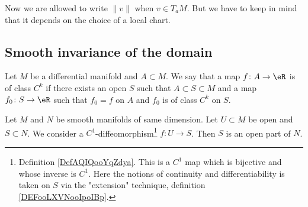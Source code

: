 Now we are allowed to write \( \| v \|\) when \( v\in T_aM\). But we have to keep in mind that it depends on the choice of a local chart.

\subsection{Smooth invariance of the domain}


\begin{definition}	\label{DEFooLXVNooIpoIBp}
	Let \( M\) be a differential manifold and \( A\subset M\). We say that a map \(f \colon A\to \eR  \) is of class \( C^k\) if there exists an open \( S\) such that \( A\subset S\subset M\) and a map \(f_0 \colon S\to \eR  \) such that \( f_0=f\) on \( A\) and \( f_0\) is of class \( C^k\) on \( S\).
\end{definition}

\begin{theorem}	\label{THOooGUELooSBQhRu}
	Let \( M\) and \( N\) be smooth manifolds of same dimension. Let \( U\subset M\) be open and \( S\subset N\). We consider a \( C^1\)-diffeomorphism\footnote{Definition \ref{DefAQIQooYqZdya}. This is a \( C^1\) map which is bijective and whose inverse is \( C^1\). Here the notions of continuity and differentiability is taken on \( S\) via the "extension" technique, definition \ref{DEFooLXVNooIpoIBp}.} \(f \colon U\to S  \). Then \( S\) is an open part of \( N\).
\end{theorem}

